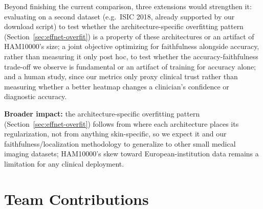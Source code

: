 \documentclass[10pt,twocolumn,letterpaper]{article}
\begin{document}
Beyond finishing the current comparison, three extensions would strengthen
it: evaluating on a second dataset (e.g.\ ISIC 2018, already supported by our
download script) to test whether the architecture-specific overfitting
pattern (Section~\ref{sec:effnet-overfit}) is a property of these
architectures or an artifact of HAM10000's size; a joint objective optimizing
for faithfulness alongside accuracy, rather than measuring it only post hoc,
to test whether the accuracy-faithfulness trade-off we observe is fundamental
or an artifact of training for accuracy alone; and a human study, since our
metrics only proxy clinical trust rather than measuring whether a better
heatmap changes a clinician's confidence or diagnostic accuracy.

\textbf{Broader impact:} the architecture-specific overfitting pattern
(Section~\ref{sec:effnet-overfit}) follows from where each architecture
places its regularization, not from anything skin-specific, so we expect it
and our faithfulness/localization methodology to generalize to other small
medical imaging datasets; HAM10000's skew toward European-institution data
remains a limitation for any clinical
deployment.

\section*{Team Contributions}
\end{document}
